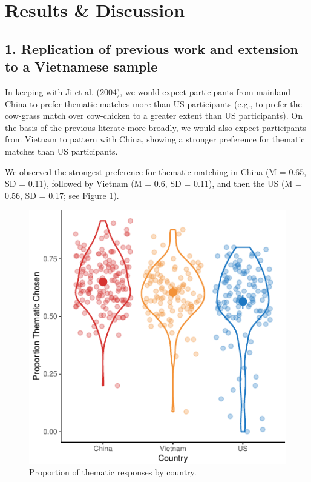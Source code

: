 \documentclass[10pt, letterpaper]{article}
\newenvironment{CodeChunk}{}{}
\begin{document}
\hypertarget{results-discussion}{%
\section{Results \& Discussion}\label{results-discussion}}

\hypertarget{replication-of-previous-work-and-extension-to-a-vietnamese-sample}{%
\subsection{1. Replication of previous work and extension to a
Vietnamese
sample}\label{replication-of-previous-work-and-extension-to-a-vietnamese-sample}}

In keeping with Ji et al. (2004), we would expect participants from
mainland China to prefer thematic matches more than US participants
(e.g., to prefer the cow-grass match over cow-chicken to a greater
extent than US participants). On the basis of the previous literate more
broadly, we would also expect participants from Vietnam to pattern with
China, showing a stronger preference for thematic matches than US
participants.

We observed the strongest preference for thematic matching in China (M =
0.65, SD = 0.11), followed by Vietnam (M = 0.6, SD = 0.11), and then the
US (M = 0.56, SD = 0.17; see Figure 1).

\begin{CodeChunk}
\begin{figure}[tb]

{\centering \includegraphics{figs/unnamed-chunk-1-1} 

}

\caption[Proportion of thematic responses by country]{Proportion of thematic responses by country.}\label{fig:unnamed-chunk-1}
\end{figure}
\end{CodeChunk}
\end{document}
